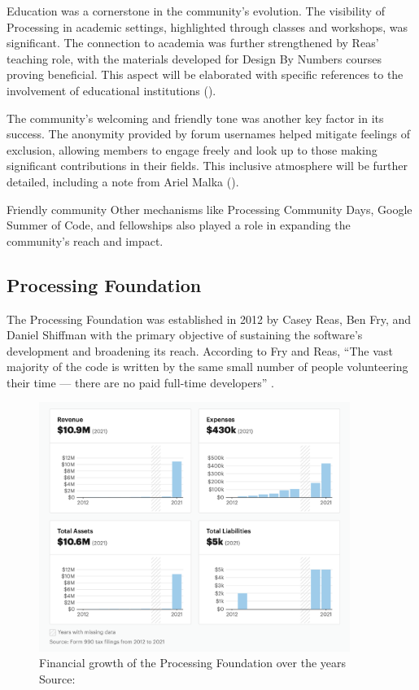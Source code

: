 Education was a cornerstone in the community's evolution. The visibility of Processing in academic settings, highlighted through classes and workshops, was significant. The connection to academia was further strengthened by Reas' teaching role, with the materials developed for Design By Numbers courses proving beneficial. This aspect will be elaborated with specific references to the involvement of educational institutions ().

The community's welcoming and friendly tone was another key factor in its success. The anonymity provided by forum usernames helped mitigate feelings of exclusion, allowing members to engage freely and look up to those making significant contributions in their fields. This inclusive atmosphere will be further detailed, including a note from Ariel Malka ().

Friendly community
Other mechanisms like Processing Community Days, Google Summer of Code, and fellowships also played a role in expanding the community's reach and impact.

\subsection{Processing Foundation}

The Processing Foundation was established in 2012 by Casey Reas, Ben Fry, and Daniel Shiffman with the primary objective of sustaining the software's development and broadening its reach. According to Fry and Reas, ``The vast majority of the code is written by the same small number of people volunteering their time — there are no paid full-time developers'' \parencite[p.~13]{fryModernPrometheusHistory2018}.

\begin{figure}[h]
	\centering
	\includegraphics[width=0.9\textwidth]{images/foundation-finances.png}
	\caption{Financial growth of the Processing Foundation over the years Source: \parencite{ProcessingFoundationNonprofit2013}}
	\label{fig:foundation-finances}
\end{figure}

